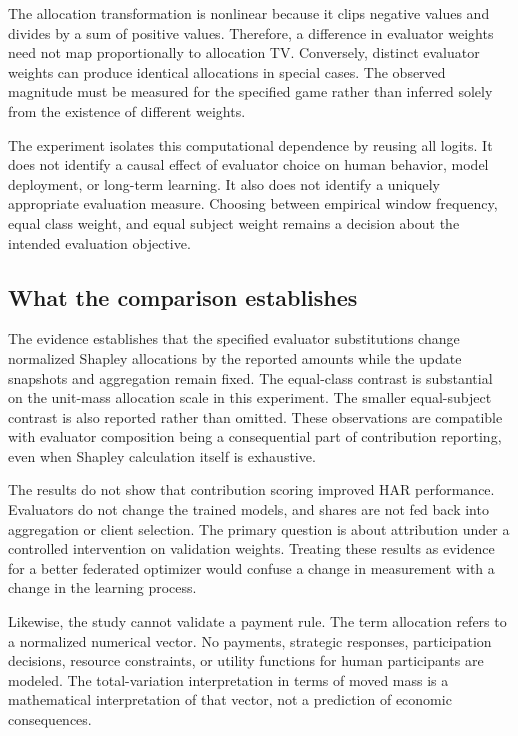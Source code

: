\documentclass[conference,letterpaper]{IEEEtran}
\begin{document}
The allocation transformation is nonlinear because it clips negative values and divides by a sum of positive values. Therefore, a difference in evaluator weights need not map proportionally to allocation TV. Conversely, distinct evaluator weights can produce identical allocations in special cases. The observed magnitude must be measured for the specified game rather than inferred solely from the existence of different weights.

The experiment isolates this computational dependence by reusing all logits. It does not identify a causal effect of evaluator choice on human behavior, model deployment, or long-term learning. It also does not identify a uniquely appropriate evaluation measure. Choosing between empirical window frequency, equal class weight, and equal subject weight remains a decision about the intended evaluation objective.

\subsection{What the comparison establishes}
The evidence establishes that the specified evaluator substitutions change normalized Shapley allocations by the reported amounts while the update snapshots and aggregation remain fixed. The equal-class contrast is substantial on the unit-mass allocation scale in this experiment. The smaller equal-subject contrast is also reported rather than omitted. These observations are compatible with evaluator composition being a consequential part of contribution reporting, even when Shapley calculation itself is exhaustive.

The results do not show that contribution scoring improved HAR performance. Evaluators do not change the trained models, and shares are not fed back into aggregation or client selection. The primary question is about attribution under a controlled intervention on validation weights. Treating these results as evidence for a better federated optimizer would confuse a change in measurement with a change in the learning process.

Likewise, the study cannot validate a payment rule. The term allocation refers to a normalized numerical vector. No payments, strategic responses, participation decisions, resource constraints, or utility functions for human participants are modeled. The total-variation interpretation in terms of moved mass is a mathematical interpretation of that vector, not a prediction of economic consequences.
\end{document}
